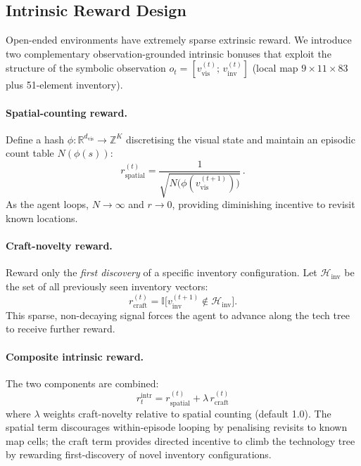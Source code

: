 \documentclass{article}
\begin{document}
\subsection{Intrinsic Reward Design}
\label{sec:intrinsic}

Open-ended environments have extremely sparse extrinsic reward.  We
introduce two complementary observation-grounded intrinsic bonuses
that exploit the structure of the symbolic observation
$o_t=[v_{\mathrm{vis}}^{(t)};\,v_{\mathrm{inv}}^{(t)}]$
(local map $9{\times}11{\times}83$ plus 51-element inventory).

\paragraph{Spatial-counting reward.}
Define a hash $\phi:\mathbb{R}^{d_{\mathrm{vis}}}\!\to\!\mathbb{Z}^K$
discretising the visual state and maintain an episodic count table
$N(\phi(s))$:
\begin{equation}
  r_{\mathrm{spatial}}^{(t)}
  =
  \frac{1}{\sqrt{N\bigl(
    \phi(v_{\mathrm{vis}}^{(t+1)})\bigr)}}\,.
  \label{eq:spatial}
\end{equation}
As the agent loops, $N\!\to\!\infty$ and $r\!\to\!0$, providing
diminishing incentive to revisit known locations.

\paragraph{Craft-novelty reward.}
Reward only the \emph{first discovery} of a specific inventory
configuration.  Let $\mathcal{H}_{\mathrm{inv}}$ be the set of all
previously seen inventory vectors:
\begin{equation}
  r_{\mathrm{craft}}^{(t)}
  =
  \mathbb{I}\!\bigl[
    v_{\mathrm{inv}}^{(t+1)}\notin\mathcal{H}_{\mathrm{inv}}
  \bigr].
  \label{eq:craft}
\end{equation}
This sparse, non-decaying signal forces the agent to advance along
the tech tree to receive further reward.

\paragraph{Composite intrinsic reward.}
The two components are combined:
\begin{equation}
\boxed{\;
  r_t^{\mathrm{intr}}
  =
  r_{\mathrm{spatial}}^{(t)}
  +
  \lambda\,r_{\mathrm{craft}}^{(t)}
\;}
  \label{eq:intr_total}
\end{equation}
where $\lambda$ weights craft-novelty relative to spatial counting
(default 1.0).  The spatial term discourages within-episode looping
by penalising revisits to known map cells; the craft term provides
directed incentive to climb the technology tree by rewarding
first-discovery of novel inventory configurations.
\end{document}
